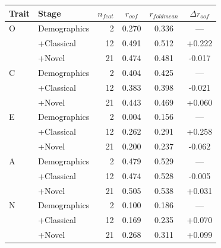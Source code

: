 \begin{tabular}{llrccc}
\toprule
Trait & Stage & $n_{feat}$ & $r_{oof}$ & $r_{foldmean}$ & $\Delta r_{oof}$ \\
\midrule
O & Demographics & 2 & 0.270 & 0.336 & --- \\
 & +Classical & 12 & 0.491 & 0.512 & +0.222 \\
 & +Novel & 21 & 0.474 & 0.481 & -0.017 \\
\midrule
C & Demographics & 2 & 0.404 & 0.425 & --- \\
 & +Classical & 12 & 0.383 & 0.398 & -0.021 \\
 & +Novel & 21 & 0.443 & 0.469 & +0.060 \\
\midrule
E & Demographics & 2 & 0.004 & 0.156 & --- \\
 & +Classical & 12 & 0.262 & 0.291 & +0.258 \\
 & +Novel & 21 & 0.200 & 0.237 & -0.062 \\
\midrule
A & Demographics & 2 & 0.479 & 0.529 & --- \\
 & +Classical & 12 & 0.474 & 0.528 & -0.005 \\
 & +Novel & 21 & 0.505 & 0.538 & +0.031 \\
\midrule
N & Demographics & 2 & 0.100 & 0.186 & --- \\
 & +Classical & 12 & 0.169 & 0.235 & +0.070 \\
 & +Novel & 21 & 0.268 & 0.311 & +0.099 \\
\bottomrule
\end{tabular}
